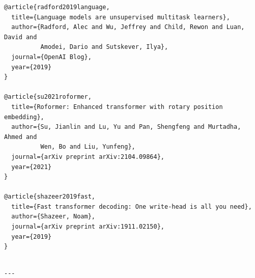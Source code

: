 \begin{lstlisting}
@article{radford2019language,
  title={Language models are unsupervised multitask learners},
  author={Radford, Alec and Wu, Jeffrey and Child, Rewon and Luan, David and 
          Amodei, Dario and Sutskever, Ilya},
  journal={OpenAI Blog},
  year={2019}
}

@article{su2021roformer,
  title={Roformer: Enhanced transformer with rotary position embedding},
  author={Su, Jianlin and Lu, Yu and Pan, Shengfeng and Murtadha, Ahmed and 
          Wen, Bo and Liu, Yunfeng},
  journal={arXiv preprint arXiv:2104.09864},
  year={2021}
}

@article{shazeer2019fast,
  title={Fast transformer decoding: One write-head is all you need},
  author={Shazeer, Noam},
  journal={arXiv preprint arXiv:1911.02150},
  year={2019}
}
\end{lstlisting}
\begin{lstlisting}

---
\end{lstlisting}